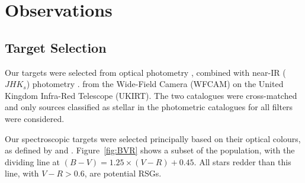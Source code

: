 \documentclass[manuscript]{aastex}
\begin{document}

\section{Observations}


\label{sec:observations}

\subsection{Target Selection} %
\label{sub:target_selection}

Our targets were selected from optical photometry
\citep{Massey07}, combined with near-IR ($JHK{_s}$) photometry
\cite[for details see][]{2012A&A...540A.135S}. from the Wide-Field Camera (WFCAM) on the United Kingdom Infra-Red Telescope (UKIRT).
The two catalogues were cross-matched and only sources classified as stellar in the photometric catalogues for all filters were considered.

Our spectroscopic targets were selected principally based on their optical colours, as defined by
\cite{Massey98} and
\cite{Levesque12}.
Figure~\ref{fig:BVR} shows a subset of the population, with the dividing line at $(B - V) = 1.25 \times (V - R)+0.45$.
All stars redder than this line, with $V - R > 0.6$, are potential RSGs.

\end{document}
